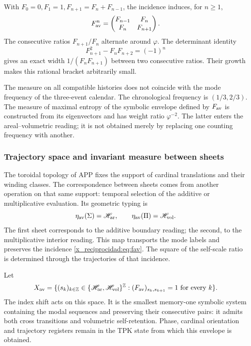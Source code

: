 With \(F_0=0,F_1=1,F_{n+1}=F_n+F_{n-1}\), the incidence induces, for \(n\geq1\),
\[
 F_{\rm av}^n=\begin{pmatrix}F_{n-1}&F_n\\F_n&F_{n+1}\end{pmatrix}.
\]
The consecutive ratios \(F_{n+1}/F_n\) alternate around \(\varphi\). The determinant identity
\[
 F_{n+1}^2-F_nF_{n+2}=(-1)^n
\]
gives an exact width \(1/(F_nF_{n+1})\) between two consecutive ratios. Their growth makes this rational bracket arbitrarily small.

The measure on all compatible histories does not coincide with the mode frequency of the three-event calendar. The chronological frequency is \((1/3,2/3)\). The measure of maximal entropy of the symbolic envelope defined by \(F_{\rm av}\) is constructed from its eigenvectors and has weight ratio \(\varphi^{-2}\). The latter enters the areal--volumetric reading; it is not obtained merely by replacing one counting frequency with another.


\subsubsection{Trajectory space and invariant measure between sheets}
\label{x_reciprocidad:sec:medida-retorno-hojas}

The toroidal topology of APP fixes the support of cardinal translations
and their winding classes. The correspondence between sheets comes from
another operation on that same support: temporal selection of the
additive or multiplicative evaluation. Its geometric typing is
\[
 \eta_{\rm av}(\Sigma)=\mathscr H_{\rm ar},\qquad
 \eta_{\rm av}(\Pi)=\mathscr H_{\rm vol}.
\]
The first sheet corresponds to the additive boundary reading; the second,
to the multiplicative interior reading. This map transports the mode
labels and preserves the incidence \eqref{x_reciprocidad:eq:fav}. The square of the self-scale
ratio is determined through the trajectories of that incidence.

\begin{definition}
Let
\[
 X_{\rm av}=\{(s_k)_{k\in\mathbb Z}\in
 \{\mathscr H_{\rm ar},\mathscr H_{\rm vol}\}^{\mathbb Z}:
 (F_{\rm av})_{s_k,s_{k+1}}=1\text{ for every }k\}.
\]
The index shift acts on this space. It is the smallest memory-one symbolic
system containing the modal sequences and preserving
their consecutive pairs: it admits both cross transitions and
volumetric self-retention. Phase, cardinal orientation and trajectory
registers remain in the TPK state from which this
envelope is obtained.
\end{definition}

